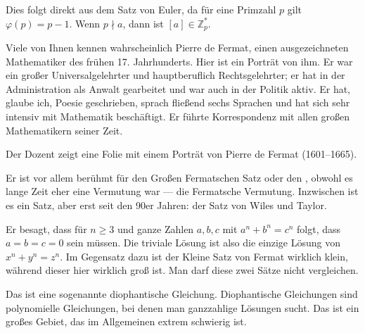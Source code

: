 \begin{math-stroke}


\begin{short-proof}
Dies folgt direkt aus dem Satz von Euler, da für eine Primzahl $p$ gilt $\varphi(p) = p-1$. Wenn $p \nmid a$, dann ist $[a] \in \mathbb{Z}_p^*$.
\end{short-proof}
\end{math-stroke}

\begin{spoken-clean}[00:51:05 - 00:52:33]
 Viele von Ihnen kennen wahrscheinlich Pierre de Fermat, einen ausgezeichneten Mathematiker des frühen 17. Jahrhunderts. Hier ist ein Porträt von ihm. Er war ein großer Universalgelehrter und hauptberuflich Rechtsgelehrter; er hat in der Administration als Anwalt gearbeitet und war auch in der Politik aktiv. Er hat, glaube ich, Poesie geschrieben, sprach fließend sechs Sprachen und hat sich sehr intensiv mit Mathematik beschäftigt. Er führte Korrespondenz mit allen großen Mathematikern seiner Zeit.
\end{spoken-clean}

\begin{meta-note}
Der Dozent zeigt eine Folie mit einem Porträt von Pierre de Fermat (1601--1665).
\end{meta-note}

\begin{spoken-clean}[00:52:33 - 00:54:30]
Er ist vor allem berühmt für den Großen Fermatschen Satz oder den , obwohl es lange Zeit eher eine Vermutung war --- die Fermatsche Vermutung. Inzwischen ist es ein Satz, aber erst seit den 90er Jahren: der Satz von Wiles und Taylor.

Er besagt, dass für $n \ge 3$ und ganze Zahlen $a, b, c$ mit $a^n + b^n = c^n$ folgt, dass $a = b = c = 0$ sein müssen. Die triviale Lösung ist also die einzige Lösung von $x^n + y^n = z^n$. Im Gegensatz dazu ist der Kleine Satz von Fermat wirklich klein, während dieser hier wirklich groß ist. Man darf diese zwei Sätze nicht vergleichen.

Das ist eine sogenannte diophantische Gleichung. Diophantische Gleichungen sind polynomielle Gleichungen, bei denen man ganzzahlige Lösungen sucht. Das ist ein großes Gebiet, das im Allgemeinen extrem schwierig ist.
\end{spoken-clean}

